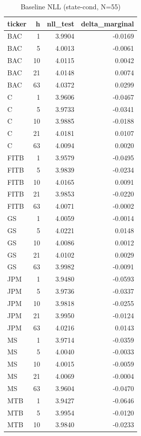 \begin{table}[ht]
\centering
\caption{Baseline NLL (state-cond, N=55)}
\label{tab:baseline-nll}
\begin{tabular}{lrrr}
\toprule
ticker & h & nll_test & delta_marginal \\
\midrule
BAC & 1 & 3.9904 & -0.0169 \\
BAC & 5 & 4.0013 & -0.0061 \\
BAC & 10 & 4.0115 & 0.0042 \\
BAC & 21 & 4.0148 & 0.0074 \\
BAC & 63 & 4.0372 & 0.0299 \\
C & 1 & 3.9606 & -0.0467 \\
C & 5 & 3.9733 & -0.0341 \\
C & 10 & 3.9885 & -0.0188 \\
C & 21 & 4.0181 & 0.0107 \\
C & 63 & 4.0094 & 0.0020 \\
FITB & 1 & 3.9579 & -0.0495 \\
FITB & 5 & 3.9839 & -0.0234 \\
FITB & 10 & 4.0165 & 0.0091 \\
FITB & 21 & 3.9853 & -0.0220 \\
FITB & 63 & 4.0071 & -0.0002 \\
GS & 1 & 4.0059 & -0.0014 \\
GS & 5 & 4.0221 & 0.0148 \\
GS & 10 & 4.0086 & 0.0012 \\
GS & 21 & 4.0102 & 0.0029 \\
GS & 63 & 3.9982 & -0.0091 \\
JPM & 1 & 3.9480 & -0.0593 \\
JPM & 5 & 3.9736 & -0.0337 \\
JPM & 10 & 3.9818 & -0.0255 \\
JPM & 21 & 3.9950 & -0.0124 \\
JPM & 63 & 4.0216 & 0.0143 \\
MS & 1 & 3.9714 & -0.0359 \\
MS & 5 & 4.0040 & -0.0033 \\
MS & 10 & 4.0015 & -0.0059 \\
MS & 21 & 4.0069 & -0.0004 \\
MS & 63 & 3.9604 & -0.0470 \\
MTB & 1 & 3.9427 & -0.0646 \\
MTB & 5 & 3.9954 & -0.0120 \\
MTB & 10 & 3.9840 & -0.0233 \\

\end{tabular}
\end{table}
